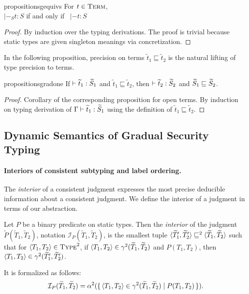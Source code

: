 \documentclass[authoryear,sort&compress,9pt,twocolumn,nocopyrightspace]{sigplanconf}
\newcommand{\oblset}[1]{\textsc{#1}}
\newcommand{\Type}{\oblset{Type}}
\newcommand{\Term}{\oblset{Term}}
\newcommand{\gprec}{\sqsubseteq} \newcommand{\sub}{<:}
\newcommand{\?}{\textsf{\upshape ?}} \newcommand{\consistent}[1]{\widetilde{#1}}
\newcommand{\collecting}[1]{\wideparen{#1}}
\newcommand{\cT}{\consistent{T}} \newcommand{\clT}{\collecting{T}}\newcommand{\ct}{\consistent{t}} \newcommand{\gvl}{\consistent{v}}
\newcommand{\cP}{\consistent{P}}
\newcommand{\interior}[1]{\mathcal{I}_{#1}}
\newcommand{\evpr}[1]{\braket{#1}}
\begin{document}
\begin{restatable}{proposition}{sgequivs}
  \label{prop:sgequivs}
  \mbox{}
  For ${t \in \Term}$, \\
  $|-_S t : S$ if and only if ~$|- t : S$
\end{restatable}
\begin{proof}
  By induction over the typing derivations.  The proof is trivial because
  static types are given singleton meanings via concretization.
\end{proof}

In the following proposition, precision on terms $\ct_1 \gprec \ct_2$ is the
natural lifting of type precision to terms.

\begin{restatable}{proposition}{sgradone}
  \label{prop:sgrad-i}
If $|- \ct_1 : \cS_1$ and $\ct_1 \gprec \ct_2$, then $|- \ct_2 : \cS_2$ and $\cS_1 \gprec \cS_2$.
\end{restatable}
\begin{proof}
  Corollary of the corresponding proposition for open terms.  By induction on
  typing derivation of $\Gamma |- \ct_1 : \cS_1$ using the definition of
  $\ct_1 \gprec \ct_2$.
\end{proof}


\subsection{Dynamic Semantics of Gradual Security Typing}


\paragraph{Interiors of consistent subtyping and label ordering.}

The \emph{interior} of a consistent judgment expresses the most precise
deducible information about a consistent judgment.  We define the interior of a
judgment in terms of our abstraction.

\begin{definition}[Interior]
  Let $P$ be a binary predicate on static types.
  Then the \emph{interior} of the judgment
  $\cP(\cT_1,\cT_2)$, notation $\interior{P}(\cT_1,\cT_2)$, is the smallest
  tuple $\evpr{\cT'_1,\cT'_2} \sqsubseteq^2 \evpr{\cT_1,\cT_2}$
  such that for $\evpr{T_1,T_2} \in \Type^2$, if
  $\evpr{T_1,T_2} \in \gamma^2(\cT_1,\cT_2)$ and $P(T_1,T_2)$, then
  $\evpr{T_1,T_2} \in \gamma^2(\cT'_1,\cT'_2)$.  

  It is formalized as follows:
  \begin{gather*}
    \interior{P}(\cT_1,\cT_2) = 
    \alpha^2(\set{\braket{T_1,T_2} \in 
      \gamma^2(\cT_1,\cT_2) | P(T_1,T_2)}).
  \end{gather*}
\end{definition}
\end{document}
